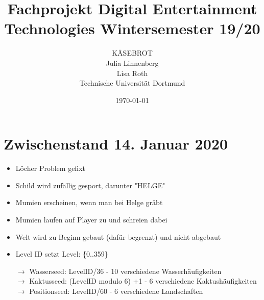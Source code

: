 \documentclass{article}
\title{Fachprojekt Digital Entertainment Technologies Wintersemester 19/20}
\author{KÄSEBROT\\
Julia Linnenberg  \\
		Lisa Roth\\	
	Technische Universität Dortmund \\
	}
\date{\today}
\begin{document}
\maketitle
\section{Zwischenstand 14. Januar 2020}
\begin{itemize}

\item Löcher Problem gefixt
\item Schild wird zufällig gesport, darunter "HELGE"
\item Mumien erscheinen, wenn man bei Helge gräbt
\item Mumien laufen auf Player zu und schreien dabei
\item Welt wird zu Beginn gebaut (dafür begrenzt) und nicht abgebaut
\item Level ID setzt Level: \{0..359\}


$\rightarrow$ Wasserseed: LevelID/36 - 10 verschiedene Wasserhäufigkeiten\\
$\rightarrow$ Kaktusseed: (LevelID modulo 6) +1 - 6 verschiedene Kaktushäufigkeiten\\
$\rightarrow$ Positionseed: LevelID/60 - 6 verschiedene Landschaften\\

\end{itemize}
\end{document}
